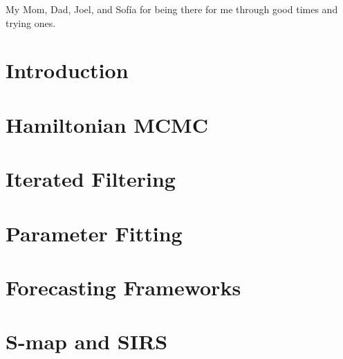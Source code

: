 \documentclass[12pt]{report}
\makeatletter
\let\org@subfile
\renewcommand*{}[1]{%
  \filename@parse{#1}%
  \expandafter
  \graphicspath\expandafter{\expandafter{\filename@area}}%
  \org@subfile{#1}%
}
\makeatother
\begin{document}
		My Mom, Dad, Joel, and Sof\'{i}a for being there for me through good times and trying ones.



	\tableofcontents

	\listoffigures


	\newpage
	
	\begin{linenumbers}

	\setcounter{page}{1}

	\chapter{Introduction}

		

	\chapter{Hamiltonian MCMC}

		

	\chapter{Iterated Filtering}

		\graphicspath{{../PF-IF2/}}
		

	\chapter{Parameter Fitting}

		\graphicspath{{../SC1/}}
		

	\chapter{Forecasting Frameworks}

		

	\chapter{S-map and SIRS}

		


\end{linenumbers}
\end{document}

